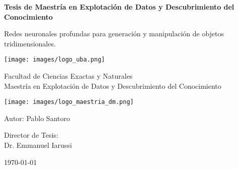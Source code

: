 \begin{titlepage}
    \begin{center}

    \huge
    \textbf{Tesis de Maestría en Explotación de Datos y Descubrimiento del Conocimiento}
    
    \vspace{0.5cm}
    
    \vfill
    \Large
    Redes neuronales profundas para generación y manipulación de objetos tridimensionales.
    
    \vspace{0.5cm}
    
    \texttt{[image: images/logo\_uba.png]}
    
    \vspace{0.5cm}
    \large
    Facultad de Ciencias Exactas y Naturales\\
    Maestría en Explotación de Datos y Descubrimiento del Conocimiento\\
    
    \vspace{0.5cm}
    
    \texttt{[image: images/logo\_maestria\_dm.png]}

    \vspace{0.5cm}
    
    Autor: Pablo Santoro
    
    \vspace{0.5cm}
    
    Director de Tesis:\\
    Dr. Emmanuel Iarussi
    
    {\today}
    
    \end{center}
\end{titlepage}

